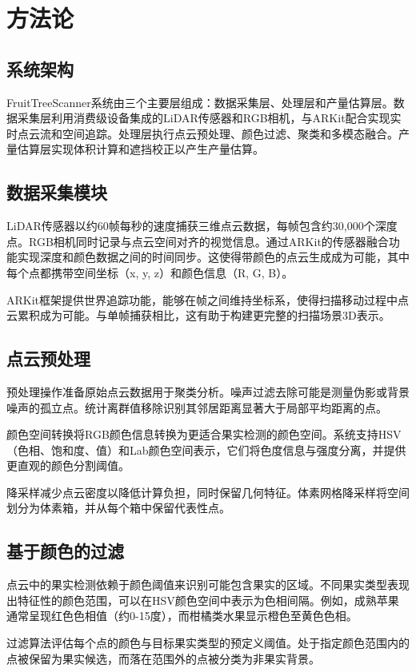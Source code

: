 \section{方法论}
\label{sec:methodology}

\subsection{系统架构}
FruitTreeScanner系统由三个主要层组成：数据采集层、处理层和产量估算层。数据采集层利用消费级设备集成的LiDAR传感器和RGB相机，与ARKit配合实现实时点云流和空间追踪。处理层执行点云预处理、颜色过滤、聚类和多模态融合。产量估算层实现体积计算和遮挡校正以产生产量估算。

\subsection{数据采集模块}
LiDAR传感器以约60帧每秒的速度捕获三维点云数据，每帧包含约30,000个深度点。RGB相机同时记录与点云空间对齐的视觉信息。通过ARKit的传感器融合功能实现深度和颜色数据之间的时间同步。这使得带颜色的点云生成成为可能，其中每个点都携带空间坐标（x, y, z）和颜色信息（R, G, B）。

ARKit框架提供世界追踪功能，能够在帧之间维持坐标系，使得扫描移动过程中点云累积成为可能。与单帧捕获相比，这有助于构建更完整的扫描场景3D表示。

\subsection{点云预处理}
预处理操作准备原始点云数据用于聚类分析。噪声过滤去除可能是测量伪影或背景噪声的孤立点。统计离群值移除识别其邻居距离显著大于局部平均距离的点。

颜色空间转换将RGB颜色信息转换为更适合果实检测的颜色空间。系统支持HSV（色相、饱和度、值）和Lab颜色空间表示，它们将色度信息与强度分离，并提供更直观的颜色分割阈值。

降采样减少点云密度以降低计算负担，同时保留几何特征。体素网格降采样将空间划分为体素箱，并从每个箱中保留代表性点。

\subsection{基于颜色的过滤}
点云中的果实检测依赖于颜色阈值来识别可能包含果实的区域。不同果实类型表现出特征性的颜色范围，可以在HSV颜色空间中表示为色相间隔。例如，成熟苹果通常呈现红色色相值（约0-15度），而柑橘类水果显示橙色至黄色色相。

过滤算法评估每个点的颜色与目标果实类型的预定义阈值。处于指定颜色范围内的点被保留为果实候选，而落在范围外的点被分类为非果实背景。

